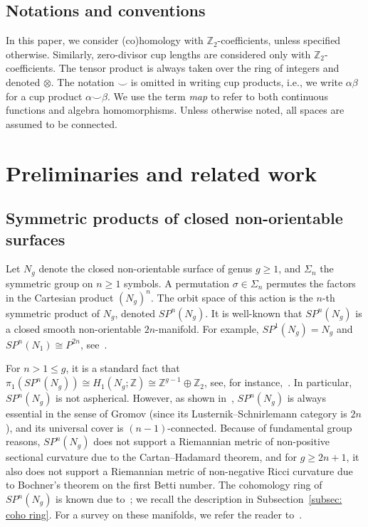 \documentclass[amscd,amssymb,verbatim,10pt]{amsart}
\numberwithin{equation}{section}
\theoremstyle{plain}
\theoremstyle{definition}
\def\Z{{\mathbb Z}}
\begin{document}
\subsection*{Notations and conventions}
In this paper, we consider (co)homology with $\Z_2$-coefficients, unless specified otherwise. Similarly, zero-divisor cup lengths are considered only with $\Z_2$-coefficients. The tensor product is always taken over the ring of integers and denoted $\otimes$. The notation $\smile$ is omitted in writing cup products, i.e., we write $\alpha\beta$ for a cup product $\alpha\smile \beta$. We use the term \emph{map} to refer to both continuous functions and algebra homomorphisms. Unless otherwise noted, all spaces are assumed to be connected.


\section{Preliminaries and related work}\label{sec: prelims}

\subsection{Symmetric products of closed non-orientable surfaces} Let $N_g$ denote the closed non-orientable surface of genus $g\ge 1$, and $\Sigma_n$ the symmetric group on $n\ge 1$ symbols. A permutation $\sigma\in \Sigma_n$ permutes the factors in the Cartesian product $(N_g)^n$. The orbit space of this action is the $n$-th symmetric product of $N_g$, denoted $SP^n(N_g)$. It is well-known that $SP^n(N_g)$ is a closed smooth non-orientable $2n$-manifold. For example, $SP^1(N_g)=N_g$ and $SP^n(N_1)\cong P^{2n}$, see~\cite{KS}.

For $n>1\leq g$, it is a standard fact that $\pi_1(SP^n(N_g))\cong H_1(N_g;\Z)\cong \Z^{g-1}\oplus\Z_2$, see, for instance,~\cite{KT}. In particular, $SP^n(N_g)$ is not aspherical. However, as shown in~\cite{Ja}, $SP^n(N_g)$ is always essential in the sense of Gromov (since its Lusternik--Schnirlemann category is $2n$),  and its universal cover is $(n-1)$-connected. Because of fundamental group reasons, $SP^n(N_g)$ does not support a Riemannian metric of non-positive sectional curvature due to the Cartan--Hadamard theorem, and for $g\ge 2n+1$, it also does not support a Riemannian metric of non-negative Ricci curvature due to Bochner's theorem on the first Betti number. The cohomology ring of $SP^n(N_g)$ is known due to~\cite{KS}; we recall the description in Subsection~\ref{subsec: coho ring}. For a survey on these manifolds, we refer the reader to~\cite{BGZ}.
\end{document}
